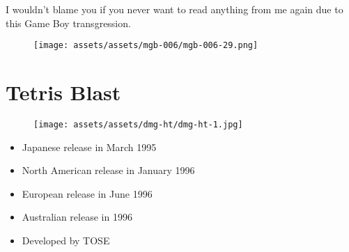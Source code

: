 \documentclass{book}
\begin{document}
I wouldn’t blame you if you never want to read anything from me again due to this Game Boy transgression.

\begin{figure}[hbt]
\vskip 10pt
\centering \texttt{[image: assets/assets/mgb-006/mgb-006-29.png]}
\vskip 6pt
\end{figure}



\begingroup \chapter*{Tetris Blast} \endgroup
\begin{figure}[H]
\vskip 4pt
\centering
\texttt{[image: assets/assets/dmg-ht/dmg-ht-1.jpg]}\end{figure}
\begin{itemize} [nosep]




\item Japanese release in March 1995







\item North American release in January 1996







\item European release in June 1996







\item Australian release in 1996












\item Developed by TOSE

\end{itemize}\noindent
\end{document}
